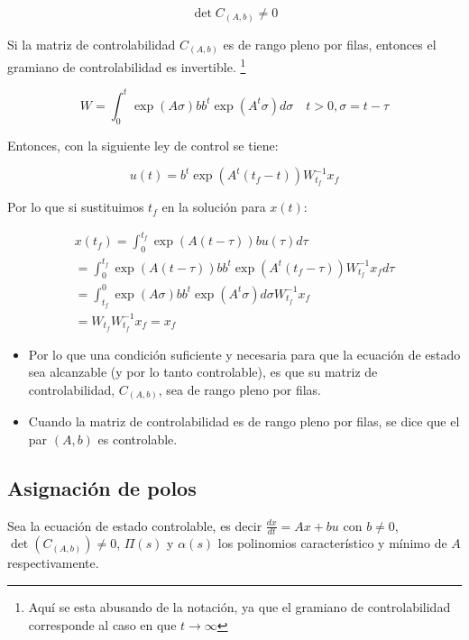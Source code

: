 \begin{equation}
\det{C_{(A,b)}} \ne 0
\end{equation}

Si la matriz de controlabilidad $C_{(A,b)}$ es de rango pleno por filas, entonces el gramiano de controlabilidad es invertible. \footnote{Aquí se esta abusando de la notación, ya que el gramiano de controlabilidad corresponde al caso en que $t \to \infty$}

\begin{equation}
W = \int_0^t \exp{(A \sigma)} b b^t \exp{(A^t \sigma)} d\sigma \quad t > 0, \sigma = t - \tau
\end{equation}

Entonces, con la siguiente ley de control se tiene:

\begin{equation}
u(t) = b^t \exp{(A^t(t_f - t))} W_{t_f}^{-1} x_f
\end{equation}

Por lo que si sustituimos $t_f$ en la solución para $x(t)$:

\begin{multline}
x(t_f) = \int_0^{t_f} \exp{(A(t - \tau))} b u(\tau) d\tau \\
       = \int_0^{t_f} \exp{(A(t - \tau))} b b^t \exp{(A^t(t_f - \tau))} W_{t_f}^{-1} x_f d\tau \\
       = \int_{t_f}^0 \exp{(A \sigma)} b b^t \exp{(A^t \sigma)} d\sigma W_{t_f}^{-1} x_f \\
       = W_{t_f} W_{t_f}^{-1} x_f = x_f
\end{multline}

\begin{itemize}
\item Por lo que una condición suficiente y necesaria para que la ecuación de estado sea alcanzable (y por lo tanto controlable), es que su matriz de controlabilidad, $C_{(A,b)}$, sea de rango pleno por filas.
\item Cuando la matriz de controlabilidad es de rango pleno por filas, se dice que el par $(A, b)$ es controlable.
\end{itemize}

\subsection{Asignación de polos}

Sea la ecuación de estado controlable, es decir $\frac{dx}{dt} = Ax + bu$ con $b \ne 0$, $\det{(C_{(A,b)})} \ne 0$, $\Pi(s)$ y $\alpha(s)$ los polinomios característico y mínimo de $A$ respectivamente.

